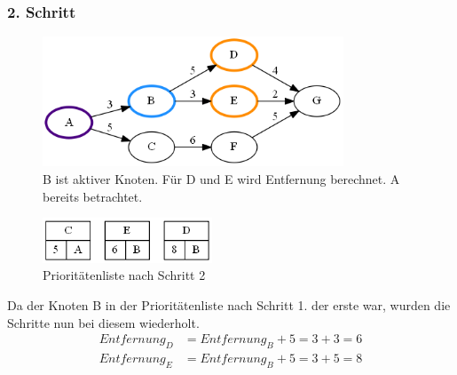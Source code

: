 \documentclass[11pt]{scrreprt}
\begin{document}
			\newpage
			\subsubsection{2. Schritt}
			\begin{figure}[ht]
				\centering
				\includegraphics[width=0.8\textwidth]{Graphs/Example2}
				\caption{B ist aktiver Knoten. Für D und E wird Entfernung berechnet. A bereits betrachtet.}
			\end{figure}
			\begin{figure}[ht]
				\centering
				\includegraphics[width=0.45\textwidth]{Graphs/Example2_PQ}
				\caption{Prioritätenliste nach Schritt 2}
			\end{figure}
			\FloatBarrier
			Da der Knoten B in der Prioritätenliste nach Schritt 1. der erste war, wurden die Schritte nun bei diesem wiederholt.
			\begin{align*}
			Entfernung_D &= Entfernung_B + 5 = 3 + 3 = 6\\
			Entfernung_E &= Entfernung_B + 5 = 3 + 5 = 8
			\end{align*}
			
			\newpage
\end{document}
